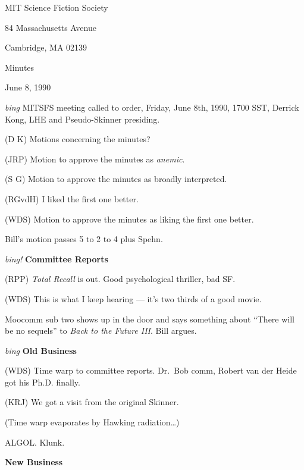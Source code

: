 \setlength{\topmargin}{-0.5in}
\setlength{\oddsidemargin}{0.0in}
\setlength{\evensidemargin}{0.0in}
\setlength{\textheight}{9in}
\setlength{\textwidth}{6.5in}



\begin{center}
MIT Science Fiction Society

84 Massachusetts Avenue

Cambridge, MA 02139

\vspace{0.2in}
Minutes

June 8, 1990

\end{center}
 
\vspace{0.15in}
{\em bing\/}  MITSFS meeting called to order, Friday, June 8th, 1990,
1700 SST, Derrick Kong, LHE and Pseudo-Skinner presiding.

(D K) Motions concerning the minutes?

(JRP) Motion to approve the minutes as {\em anemic\/}.

(S G) Motion to approve the minutes as broadly interpreted.

(RGvdH) I liked the first one better.

(WDS) Motion to approve the minutes as liking the first one better.

Bill's motion passes 5 to 2 to 4 plus Spehn.

\vspace{.15in}
{\em bing!\/}  {\bf Committee Reports\/}

(RPP) {\em Total Recall\/} is out.  Good psychological thriller, bad SF.

(WDS) This is what I keep hearing --- it's two thirds of a good movie.

Moocomm sub two shows up in the door and says something about ``There will
be no sequels'' to {\em Back to the Future III\/}.  Bill argues.

\vspace{.15in}
{\em bing\/} {\bf Old Business\/}

(WDS) Time warp to committee reports.  Dr.~Bob comm, Robert van der Heide
got his Ph.D. finally.

(KRJ) We got a visit from the original Skinner.

(Time warp evaporates by Hawking radiation\ldots)

ALGOL.  Klunk.

\vspace{0.15in}
{\bf New Business\/}


